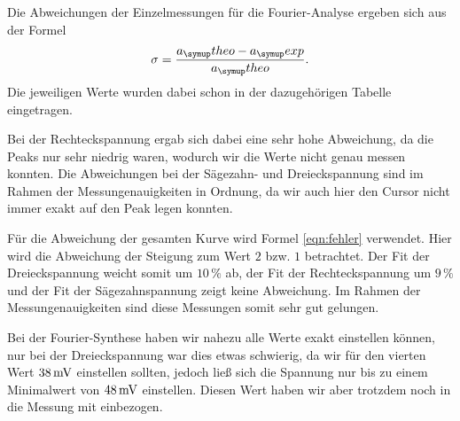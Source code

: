 Die Abweichungen der Einzelmessungen für die Fourier-Analyse ergeben sich aus der Formel
\begin{equation}
  \sigma = \frac{a_\su{theo}-a_\su{exp}}{a_\su{theo}}.
\end{equation}
Die jeweiligen Werte wurden dabei schon in der dazugehörigen Tabelle eingetragen.


\noindent Bei der Rechteckspannung ergab sich dabei eine sehr hohe Abweichung, da die Peaks nur
sehr niedrig waren, wodurch wir die Werte nicht genau messen konnten. Die Abweichungen
bei der Sägezahn- und Dreieckspannung sind im Rahmen der Messungenauigkeiten in Ordnung,
da wir auch hier den Cursor nicht immer exakt auf den Peak legen konnten.


\noindent Für die Abweichung der gesamten Kurve wird Formel \eqref{eqn:fehler} verwendet.
Hier wird die Abweichung der Steigung zum Wert $2$ bzw. $1$ betrachtet.
Der Fit der Dreieckspannung weicht somit um $10\,\%$ ab, der Fit der Rechteckspannung
um $9\,\%$ und der Fit der Sägezahnspannung zeigt keine Abweichung.
Im Rahmen der Messungenauigkeiten sind diese Messungen somit sehr gut gelungen.

\noindent Bei der Fourier-Synthese haben wir nahezu alle Werte exakt einstellen können,
nur bei der Dreieckspannung war dies etwas schwierig, da wir für den vierten Wert $38 \,\si{\milli\volt}$
einstellen sollten, jedoch ließ sich die Spannung nur bis zu einem Minimalwert von $48 \,\si{\milli\volt}$
einstellen. Diesen Wert haben wir aber trotzdem noch in die Messung mit einbezogen.
